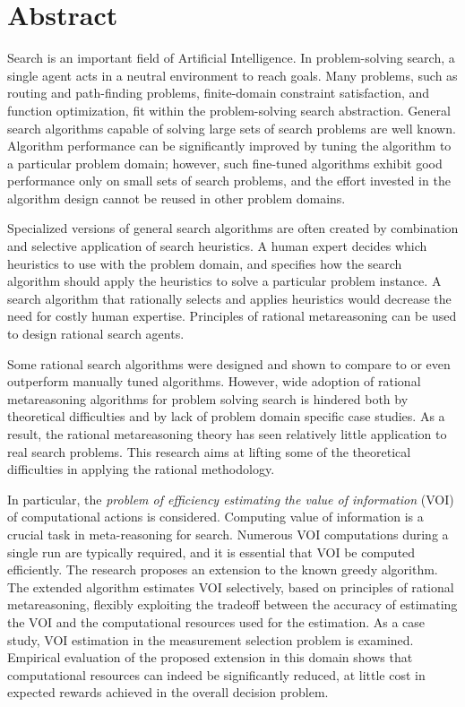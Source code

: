 \section*{Abstract}

Search is an important field of Artificial Intelligence.
In problem-solving search, a single agent acts
in a neutral environment to reach goals. Many problems, such as
routing and path-finding problems, finite-domain constraint
satisfaction, and function optimization, fit within the problem-solving
search abstraction. General search algorithms capable of solving large
sets of search problems are well known. Algorithm performance can be
significantly improved by tuning the algorithm to a particular problem
domain; however, such fine-tuned algorithms exhibit good performance
only on small sets of search problems, and the effort invested in the
algorithm design cannot be reused in other problem domains.

Specialized versions of general search algorithms are often created by
combination and selective application of search  heuristics.
A human expert decides which heuristics to use with the
problem domain, and specifies how the search algorithm should apply
the heuristics to solve a particular problem instance. A search
algorithm that rationally selects and applies heuristics would decrease
the need for costly human expertise. Principles of rational
metareasoning can be used to design rational search agents.  

Some rational search algorithms were designed and shown to compare to
or even outperform manually tuned algorithms. However, wide adoption
of rational metareasoning algorithms for problem solving search is
hindered both by theoretical difficulties and by lack of problem
domain specific case studies. As a result, the rational metareasoning
theory has seen relatively little application to real search
problems. This research aims at lifting some of the theoretical
difficulties in applying the rational methodology. 

In particular, the \emph{problem of efficiency estimating the value of
information} (VOI) of computational actions is considered. Computing value of
information is a crucial task in meta-reasoning for search. Numerous
VOI computations during a single run are typically required, and it is
essential that VOI be computed efficiently. The research proposes
an extension to the known greedy algorithm. The extended algorithm
estimates VOI selectively, based on principles of rational
metareasoning, flexibly exploiting the tradeoff between the
accuracy of estimating the VOI and the computational resources used for the
estimation. As a case study, VOI estimation in the measurement selection
problem is examined.  Empirical evaluation of the proposed extension in this
domain shows that computational resources can indeed be significantly
reduced, at little cost in expected rewards achieved in the overall
decision problem.

